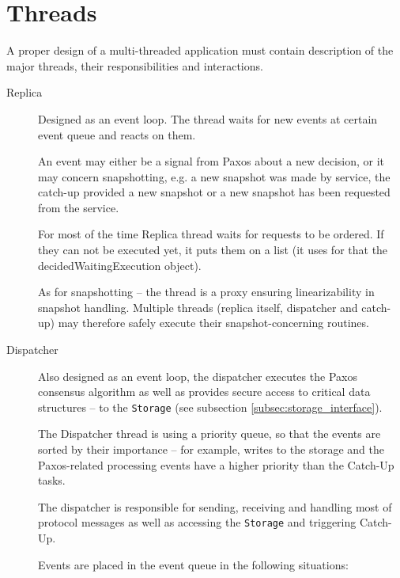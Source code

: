 \section{Threads}
\label{sec:threads}

A proper design of a multi-threaded application %
must contain description of the major threads, their responsibilities and interactions. 

\begin{description}
  \item[Replica] \hfill
    
    Designed as an event loop. The thread %
    waits for new events at certain event queue and reacts on them.

    An event may either be a signal from Paxos about a new decision, or it may concern snapshotting, e.g. a new snapshot was made by service, the catch-up provided a new snapshot or a new snapshot has been requested from the service.

    For most of the time Replica thread waits for requests to be ordered. If they can not be executed yet, it puts them on a list (it uses for that %
    the decidedWaitingExecution object).
    
    As for snapshotting -- the thread is a proxy ensuring linearizability in snapshot handling.
    Multiple threads (replica itself, dispatcher and catch-up) may therefore safely execute their snapshot-concerning routines.
    
  \item[Dispatcher] \hfill \nopagebreak
    
    Also designed as an event loop, the dispatcher executes the Paxos consensus algorithm as well as provides secure access to critical data structures -- to the \texttt{Storage} (see subsection \ref{subsec:storage_interface}).
    
    The Dispatcher thread is using a priority queue, so that the events are sorted by their importance -- for example, writes to the storage and the Paxos-related processing events have a higher priority than the Catch-Up tasks.
    
    The dispatcher is responsible for sending, receiving and handling most of protocol messages as well as accessing the \texttt{Storage} and triggering Catch-Up.
    
    Events are placed in the event queue in the following situations:
    


\end{description}
